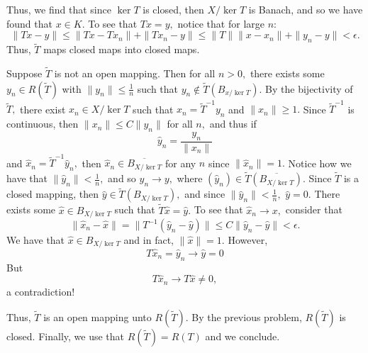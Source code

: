 \documentclass[11pt]{article}
\begin{document}
\begin{solution}
    Thus, we find that since $\ker T$ is closed, then $X/\ker T$ is Banach, and so we have found that $x\in K.$ To see that $Tx= y,$ notice that for large $n:$
    \[\|Tx - y\|\leq \|Tx - Tx_n\| + \|Tx_n - y\| \leq \|T\|\|x - x_n\| + \|y_n - y\| < \epsilon.\] Thus, $\tilde{T}$ maps closed maps into closed maps. 

    Suppose $\tilde{T}$ is not an open mapping. Then for all $n>0,$ there exists some $y_n\in R(\tilde{T})$ with $\|y_n\| \leq \frac{1}{n}$ such that $y_n \notin \tilde{T}(B_{x/\ker T}).$ By the bijectivity of $\tilde{T},$ there exist $x_n \in X/\ker T$ such that $x_n = \tilde{T}^{-1}y_n$ and $\|x_n\|\geq 1.$ Since $\tilde{T}^{-1}$ is continuous, then $\|x_n\|\leq C\|y_n\|$ for all $n,$ and thus if 
    \[\hat{y}_n = \frac{y_n}{\|x_n\|}\] and $\hat{x}_n = \tilde{T}^{-1}\hat{y}_n,$ then $\hat{x}_n \in \overline{B_{X/\ker T}}$ for any $n$ since $\|\hat{x}_n\| = 1.$ Notice how we have that $\|\hat{y}_n\| < \frac{1}{n},$ and so $y_n \to y,$ where $(\hat{y}_n)\in \tilde{T}(\overline{B_{X/\ker T}}).$ Since $\tilde{T}$ is a closed mapping, then $\hat{y}\in \tilde{T}(B_{X/\ker T}),$ and since $\|\hat{y}_n\|< \frac{1}{n},$ $\hat{y} = 0.$
    There exists some $\hat{x}\in B_{X/\ker T}$ such that $\tilde{T}\hat{x} = \hat{y}.$ To see that $\hat{x}_n \to x,$ consider that 
    \[\|\hat{x}_n - \hat{x}\|= \|T^{-1}(\hat{y}_n - \hat{y})\| \leq C\|\hat{y}_n - \hat{y}\| < \epsilon.\] We have that $\hat{x} \in B_{X/\ker T}$ and in fact, $\|\hat{x}\| = 1.$ However, 
    \[T\hat{x}_n = \hat{y}_n \to \hat{y} = 0\] But 
    \[T\hat{x}_n \to T\hat{x} \neq 0,\] a contradiction! 
    
    Thus, $\tilde{T}$ is an open mapping unto $R(\tilde{T}).$ By the previous problem, $R(\tilde{T})$ is closed. Finally, we use that $R(\tilde{T}) = R(T)$ and we conclude.
    
\end{solution}




\newpage
\end{document}
